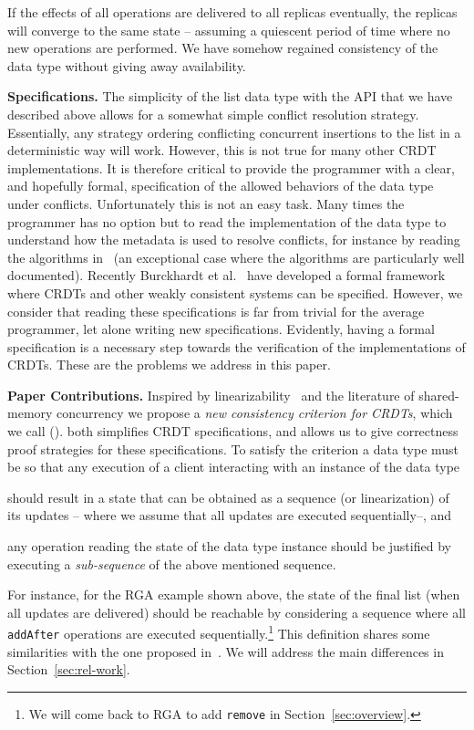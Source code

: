 If the effects of all operations are
delivered to all replicas eventually, the replicas will converge to
the same state -- assuming a quiescent period of time where no new
operations are performed.
%
We have somehow regained consistency of the data type without
giving away availability.

\smallskip
\noindent
{\bf Specifications.}
The simplicity of the list data type with the API that we have
described above allows for a somewhat simple conflict resolution
strategy.
%
Essentially, any strategy ordering conflicting concurrent insertions
to the list in a deterministic way will work.
%
However, this is not true for many other CRDT implementations.
%
It is therefore critical to provide the programmer with a clear, and
hopefully formal, specification of the allowed behaviors of the data
type under conflicts.
%
Unfortunately this is not an easy task.
%
Many times the programmer has no option but to read the implementation
of the data type to understand how the metadata is used to 
resolve conflicts, for instance by reading the algorithms
in~\cite{ShapiroPBZ11} (an exceptional case where the algorithms are
particularly well documented).
%
Recently Burckhardt et al.~\cite{BurckhardtGYZ14, Burckhardt14} have
developed a formal framework where CRDTs and other weakly
consistent systems can be specified.
%
However, we consider that reading these specifications is far from
trivial for the average programmer, let alone writing new
specifications.
%
Evidently, having a formal specification is a necessary step towards
the verification of the implementations of CRDTs.
%
These are the problems we address in this paper.

\smallskip
\noindent
{\bf Paper Contributions.}
Inspired by linearizability~\cite{HerlihyW90} and the literature of
shared-memory concurrency we propose a \emph{new consistency criterion
  for CRDTs}, which we call \emph{\CRDTLin{}} (\CRDTLinshort{}).
%
\CRDTLinshort{} both simplifies CRDT specifications, and allows us to
give correctness proof strategies for these specifications.
%
To satisfy the \CRDTLinshort{} criterion a data type must be so that
any execution of a client interacting with an instance of the data
type
\begin{inparaenum}
\item should result in a state that can be obtained as a sequence (or
  linearization) of its updates -- where we assume that all updates
  are executed sequentially--, and
\item any operation reading the state of the data type instance should
  be justified by executing a \emph{sub-sequence} of the above
  mentioned sequence.
\end{inparaenum}
For instance, for the RGA example shown above, the state of the final
list (when all updates are delivered) should be reachable by considering a sequence where all
\lstinline|addAfter| operations are executed sequentially.\footnote{We
  will come back to RGA to add \lstinline|remove|
  in Section~\ref{sec:overview}.}
%
This definition shares some similarities with the one proposed
in~\cite{PerrinMJ14}. We will address the main differences
in Section~\ref{sec:rel-work}.

